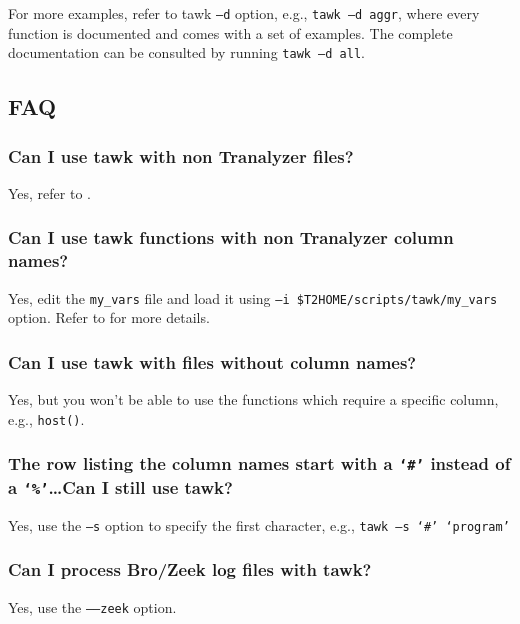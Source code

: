 \documentclass[documentation]{subfiles}
\begin{document}
For more examples, refer to tawk {\tt --d} option, e.g., {\tt tawk --d aggr}, where every function is documented and comes with a set of examples.
The complete documentation can be consulted by running {\tt tawk --d all}.


\subsection{FAQ}

\subsubsection{Can I use tawk with non Tranalyzer files?}
Yes, refer to .

\subsubsection{Can I use tawk functions with non Tranalyzer column names?}
Yes, edit the {\tt my\_vars} file and load it using {\tt --i \$T2HOME/scripts/tawk/my\_vars} option.
Refer to  for more details.

\subsubsection{Can I use tawk with files without column names?}
Yes, but you won't be able to use the functions which require a specific column, e.g., {\tt host()}.

\subsubsection{The row listing the column names start with a {\tt `\#'} instead of a {\tt `\%'}\ldots Can I still use tawk?}
Yes, use the {\tt --s} option to specify the first character, e.g., {\tt tawk --s `\#' `program'}

\subsubsection{Can I process Bro/Zeek log files with tawk?}
Yes, use the {\tt --{}--zeek} option.
\end{document}
